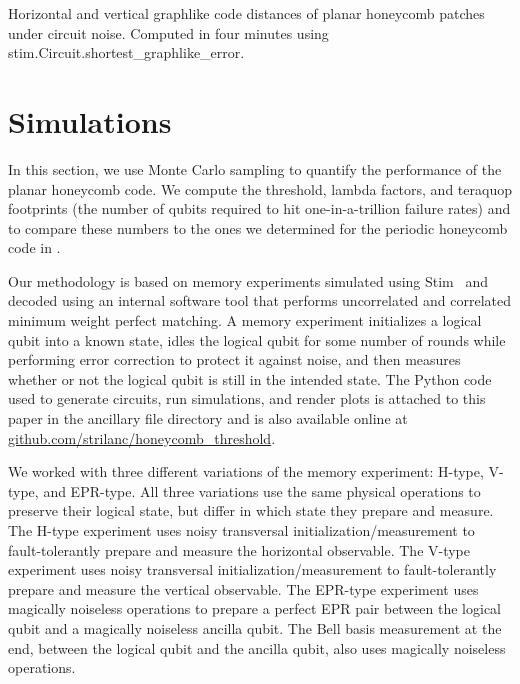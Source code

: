 \documentclass[onecolumn,a4paper,accepted=2022-09-12]{quantumarticle}
\theoremstyle{definition}
\theoremstyle{definition}
\theoremstyle{definition}
\begin{document}
\begin{table}[ht!]
    \centering
    \resizebox{\linewidth}{!}{
    
    }
    \caption{
    Horizontal and vertical graphlike code distances of planar honeycomb patches under circuit noise.
    Computed in four minutes using stim.Circuit.shortest\_graphlike\_error.
    }
    \label{tbl:graphlike_distances}
\end{table}

\section{Simulations}
\label{sec:sims}

In this section, we use Monte Carlo sampling to quantify the performance of the planar honeycomb code.
We compute the threshold, lambda factors, and teraquop footprints (the number of qubits required to hit one-in-a-trillion failure rates) and to compare these numbers to the ones we determined for the periodic honeycomb code in \cite{gidney2021honeycombmemory}.

Our methodology is based on memory experiments simulated using Stim~\cite{gidney2021stim} and decoded using an internal software tool that performs uncorrelated and correlated minimum weight perfect matching.
A memory experiment initializes a logical qubit into a known state, idles the logical qubit for some number of rounds while performing error correction to protect it against noise, and then measures whether or not the logical qubit is still in the intended state.
The Python code used to generate circuits, run simulations, and render plots is attached to this paper in the ancillary file directory  and is also available online at \href{https://github.com/strilanc/honeycomb_threshold}{github.com/strilanc/honeycomb\_threshold}.

We worked with three different variations of the memory experiment: H-type, V-type, and EPR-type.
All three variations use the same physical operations to preserve their logical state, but differ in which state they prepare and measure.
The H-type experiment uses noisy transversal initialization/measurement to fault-tolerantly prepare and measure the horizontal observable.
The V-type experiment uses noisy transversal initialization/measurement to fault-tolerantly prepare and measure the vertical observable.
The EPR-type experiment uses magically noiseless operations to prepare a perfect EPR pair between the logical qubit and a magically noiseless ancilla qubit.
The Bell basis measurement at the end, between the logical qubit and the ancilla qubit, also uses magically noiseless operations.
\end{document}
